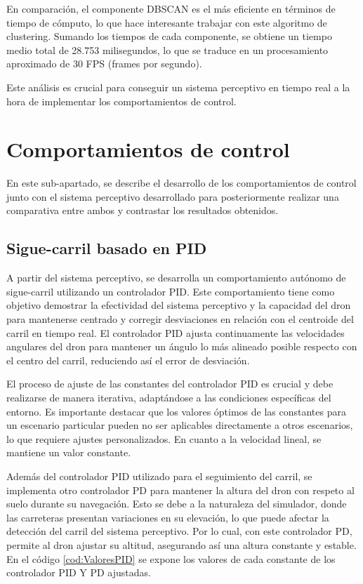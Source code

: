 En comparación, el componente DBSCAN es el más eficiente en términos de tiempo de cómputo, lo que hace interesante trabajar con este algoritmo de clustering. 
Sumando los tiempos de cada componente, se obtiene un tiempo medio total de 28.753 milisegundos, lo que se traduce en un procesamiento aproximado de 30 FPS (frames por segundo). 

Este análisis es crucial para conseguir un sistema perceptivo en tiempo real a la hora de implementar los comportamientos de control. 

  \section{Comportamientos de control}
  \label{sec:Control}

  En este sub-apartado, se describe el desarrollo de los comportamientos de control junto con el sistema perceptivo desarrollado para posteriormente realizar 
  una comparativa entre ambos y contrastar los resultados obtenidos.

\subsection{Sigue-carril basado en PID}
\label{sec:Control-PID}

A partir del sistema perceptivo, se desarrolla un comportamiento autónomo de sigue-carril utilizando un controlador PID. Este comportamiento tiene como objetivo
demostrar la efectividad del sistema perceptivo y la capacidad del dron para mantenerse centrado y corregir desviaciones en relación
con el centroide del carril en tiempo real. El controlador PID ajusta continuamente las velocidades angulares del dron para mantener un ángulo lo más alineado posible respecto con el
centro del carril, reduciendo así el error de desviación.

El proceso de ajuste de las constantes del controlador PID es crucial y debe realizarse de manera iterativa, adaptándose a las condiciones específicas del entorno. Es importante
destacar que los valores óptimos de las constantes para un escenario particular pueden no ser aplicables directamente a otros escenarios, lo que requiere ajustes personalizados. 
En cuanto a la velocidad lineal, se mantiene un valor constante.

Además del controlador PID utilizado para el seguimiento del carril, se implementa otro controlador PD para mantener la altura del dron con respeto al suelo durante su navegación. 
Esto se debe a la naturaleza del simulador, donde las carreteras presentan variaciones en su elevación, lo que puede afectar la detección del carril del sistema perceptivo. Por lo cual, 
con este controlador PD, permite al dron ajustar su altitud, asegurando así una altura constante y estable. En el código \ref{cod:ValoresPID} se expone los valores de cada 
constante de los controlador PID Y PD ajustadas.

